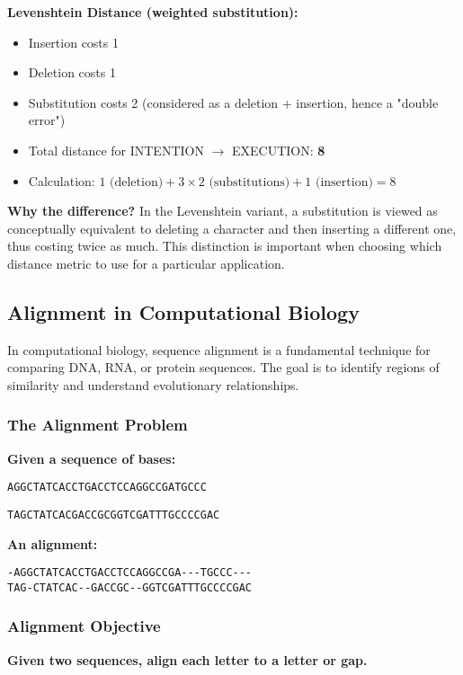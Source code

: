 \documentclass[11pt,a4paper]{article}
\theoremstyle{definition}
\theoremstyle{plain}
\theoremstyle{remark}
\begin{document}
\textbf{Levenshtein Distance (weighted substitution):}
\begin{itemize}
    \item Insertion costs 1
    \item Deletion costs 1
    \item Substitution costs 2 (considered as a deletion + insertion, hence a "double error")
    \item Total distance for INTENTION $\rightarrow$ EXECUTION: \textbf{8}
    \item Calculation: $1 \text{ (deletion)} + 3 \times 2 \text{ (substitutions)} + 1 \text{ (insertion)} = 8$
\end{itemize}

\textbf{Why the difference?} In the Levenshtein variant, a substitution is viewed as conceptually equivalent to deleting a character and then inserting a different one, thus costing twice as much. This distinction is important when choosing which distance metric to use for a particular application.

\subsection{Alignment in Computational Biology}

In computational biology, sequence alignment is a fundamental technique for comparing DNA, RNA, or protein sequences. The goal is to identify regions of similarity and understand evolutionary relationships.

\subsubsection{The Alignment Problem}

\textbf{Given a sequence of bases:}

\texttt{AGGCTATCACCTGACCTCCAGGCCGATGCCC}

\texttt{TAGCTATCACGACCGCGGTCGATTTGCCCCGAC}

\textbf{An alignment:}

\begin{verbatim}
-AGGCTATCACCTGACCTCCAGGCCGA---TGCCC---
TAG-CTATCAC--GACCGC--GGTCGATTTGCCCCGAC
\end{verbatim}

\subsubsection{Alignment Objective}

\textbf{Given two sequences, align each letter to a letter or gap.}
\end{document}
